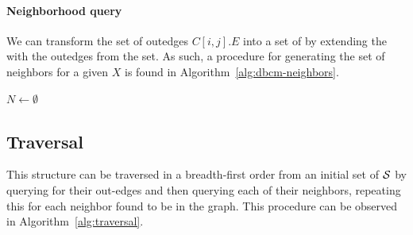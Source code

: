 \paragraph*{Neighborhood query} We can transform the set of outedges $C[i,j].E$ into a set of  by extending the \kmer with the outedges from the set. As such, a procedure for generating the set of neighbors for a given \kmer $X$ is found in Algorithm~\ref{alg:dbcm-neighbors}.

\begin{algorithm}
	\caption{$C.\mathit{neighbors}(X)$}\label{alg:dbcm-neighbors}
  $N \gets \emptyset$\\
\end{algorithm}

\subsection{\dBCM Traversal}
\label{subsubsec:dbcm-navigation}

This structure can be traversed in a breadth-first order from an initial set of  $\strsetname{S}$ by querying for their out-edges and then querying each of their neighbors, repeating this for each neighbor found to be in the graph. This procedure can be observed in Algorithm~\ref{alg:traversal}.


